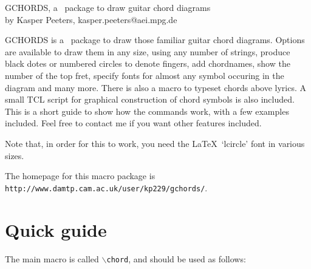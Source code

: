 \documentclass{article}
\begin{document}
\begin{center}
{\Large GCHORDS, a \LaTeXe\ package to draw guitar chord diagrams}\\
\vskip 0.2cm
{\large by Kasper Peeters, kasper.peeters@aei.mpg.de}
\end{center}
\vskip 4cm GCHORDS is a \LaTeXe\ package to draw those familiar guitar
chord diagrams. Options are available to draw them in any size, using
any number of strings, produce black dotes or numbered circles to
denote fingers, add chordnames, show the number of the top fret,
specify fonts for almost any symbol occuring in the diagram and many
more. There is also a macro to typeset chords above lyrics. A small
TCL script for graphical construction of chord symbols is also
included.  This is a short guide to show how the commands work, with a
few examples included. Feel free to contact me if you want other
features included.
\medskip

Note that, in order for this to work, you need the \LaTeX\ `lcircle' font
in various sizes.
\medskip

The homepage for this macro package is
{\tt http://www.damtp.cam.ac.uk/user/kp229/gchords/}.

\renewcommand\topfretsiz{3pt}

\section{Quick guide}

The main macro is called {\tt$\backslash$chord}, and should be used as follows:
\end{document}
